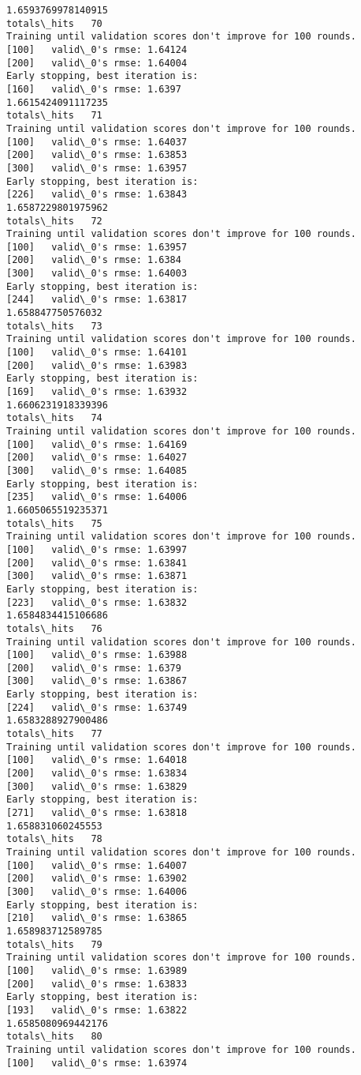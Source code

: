 \documentclass[11pt]{article}
\begin{document}
\begin{Verbatim}[commandchars=\\\{\}]
1.6593769978140915
totals\_hits   70
Training until validation scores don't improve for 100 rounds.
[100]	valid\_0's rmse: 1.64124
[200]	valid\_0's rmse: 1.64004
Early stopping, best iteration is:
[160]	valid\_0's rmse: 1.6397
1.6615424091117235
totals\_hits   71
Training until validation scores don't improve for 100 rounds.
[100]	valid\_0's rmse: 1.64037
[200]	valid\_0's rmse: 1.63853
[300]	valid\_0's rmse: 1.63957
Early stopping, best iteration is:
[226]	valid\_0's rmse: 1.63843
1.6587229801975962
totals\_hits   72
Training until validation scores don't improve for 100 rounds.
[100]	valid\_0's rmse: 1.63957
[200]	valid\_0's rmse: 1.6384
[300]	valid\_0's rmse: 1.64003
Early stopping, best iteration is:
[244]	valid\_0's rmse: 1.63817
1.658847750576032
totals\_hits   73
Training until validation scores don't improve for 100 rounds.
[100]	valid\_0's rmse: 1.64101
[200]	valid\_0's rmse: 1.63983
Early stopping, best iteration is:
[169]	valid\_0's rmse: 1.63932
1.6606231918339396
totals\_hits   74
Training until validation scores don't improve for 100 rounds.
[100]	valid\_0's rmse: 1.64169
[200]	valid\_0's rmse: 1.64027
[300]	valid\_0's rmse: 1.64085
Early stopping, best iteration is:
[235]	valid\_0's rmse: 1.64006
1.6605065519235371
totals\_hits   75
Training until validation scores don't improve for 100 rounds.
[100]	valid\_0's rmse: 1.63997
[200]	valid\_0's rmse: 1.63841
[300]	valid\_0's rmse: 1.63871
Early stopping, best iteration is:
[223]	valid\_0's rmse: 1.63832
1.6584834415106686
totals\_hits   76
Training until validation scores don't improve for 100 rounds.
[100]	valid\_0's rmse: 1.63988
[200]	valid\_0's rmse: 1.6379
[300]	valid\_0's rmse: 1.63867
Early stopping, best iteration is:
[224]	valid\_0's rmse: 1.63749
1.6583288927900486
totals\_hits   77
Training until validation scores don't improve for 100 rounds.
[100]	valid\_0's rmse: 1.64018
[200]	valid\_0's rmse: 1.63834
[300]	valid\_0's rmse: 1.63829
Early stopping, best iteration is:
[271]	valid\_0's rmse: 1.63818
1.658831060245553
totals\_hits   78
Training until validation scores don't improve for 100 rounds.
[100]	valid\_0's rmse: 1.64007
[200]	valid\_0's rmse: 1.63902
[300]	valid\_0's rmse: 1.64006
Early stopping, best iteration is:
[210]	valid\_0's rmse: 1.63865
1.658983712589785
totals\_hits   79
Training until validation scores don't improve for 100 rounds.
[100]	valid\_0's rmse: 1.63989
[200]	valid\_0's rmse: 1.63833
Early stopping, best iteration is:
[193]	valid\_0's rmse: 1.63822
1.6585080969442176
totals\_hits   80
Training until validation scores don't improve for 100 rounds.
[100]	valid\_0's rmse: 1.63974

\end{Verbatim}
\end{document}
